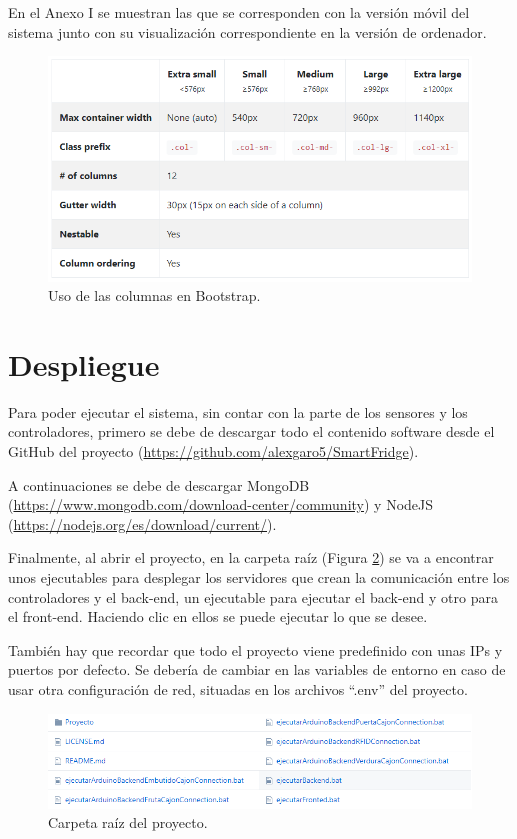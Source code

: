 En el Anexo I se muestran las que se corresponden con la versión móvil del sistema junto con su visualización correspondiente en la versión de ordenador.

\begin{figure}[h] 
    \centering
    \includegraphics[width=.70\textwidth]{capitulos/capitulo8/boot.png}
    \caption{Uso de las columnas en Bootstrap.}
    \label{fig:bootstrap}
\end{figure}

\section{Despliegue}

Para poder ejecutar el sistema, sin contar con la parte de los sensores y los controladores, primero se debe de descargar todo el contenido software desde el GitHub del proyecto (\url{https://github.com/alexgaro5/SmartFridge}).

A continuaciones se debe de descargar MongoDB (\url{https://www.mongodb.com/download-center/community}) y NodeJS (\url{https://nodejs.org/es/download/current/}).

Finalmente, al abrir el proyecto, en la carpeta raíz (Figura \ref{fig:rootproyect}) se va a encontrar unos ejecutables para desplegar los servidores que crean la comunicación entre los controladores y el back-end, un ejecutable para ejecutar el back-end y otro para el front-end. Haciendo clic en ellos se puede ejecutar lo que se desee.

También hay que recordar que todo el proyecto viene predefinido con unas IPs y puertos por defecto. Se debería de cambiar en las variables de entorno en caso de usar otra configuración de red, situadas en los archivos “.env” del proyecto.

\begin{figure}[h] 
    \centering
    \includegraphics[width=\textwidth]{capitulos/capitulo8/proyect.png}
    \caption{Carpeta raíz del proyecto.}
    \label{fig:rootproyect}
\end{figure}